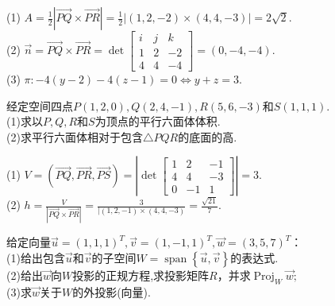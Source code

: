 \begin{solution}
    (1) $\displaystyle A= \frac{1}{2}|\overrightarrow{PQ} \times \overrightarrow{PR}|= \frac{1}{2}|(1,2,-2) \times (4,4,-3)| = 2\sqrt{2}. $\\
    (2) $\overrightarrow{n}= \overrightarrow{PQ} \times \overrightarrow{PR} = \det \begin{bmatrix}
        i &j &k \\
        1 &2 &-2 \\
        4 &4 &-4    
    \end{bmatrix} = (0,-4,-4)$.\\
    (3) $\pi: -4(y-2)-4(z-1)=0 \Leftrightarrow y+z=3$.
\end{solution}

\begin{problem}{}{}
    经定空间四点$P(1,2,0),Q(2,4,-1),R(5,6,-3)$和$S(1,1,1)$.\\
(1)求以$P,Q,R$和$S$为顶点的平行六面体体积.\\
(2)求平行六面体相对于包含$\triangle PQR$的底面的高.
\end{problem}

\begin{solution}
    (1) $ \displaystyle 
        V = (\overrightarrow{PQ},\overrightarrow{PR},\overrightarrow{PS}) =\left| \det \begin{bmatrix}
            1 &2 &-1 \\
            4 &4 &-3 \\
            0 &-1 &1
        \end{bmatrix} \right |= 3$.\\
    (2) $\displaystyle h = \frac{V}{|\overrightarrow{PQ} \times \overrightarrow{PR}|} = \frac{3}{|(1,2,-1) \times (4,4,-3)} = \frac{\sqrt{21}}{7}$.
\end{solution}

\begin{problem}{}{}
    给定向量$\overrightarrow{u}=(1,1,1)^{T},\overrightarrow{v}=(1,-1,1)^{T},\overrightarrow{w}=(3,5,7)^{T}$：\\
(1)给出包含$\overrightarrow{u}$和$\overrightarrow{v}$的子空间$W=\operatorname{span}\left\{\overrightarrow{u},\overrightarrow{v}\right\}$的表达式.\\
(2)给出$\overrightarrow{w}$向$W$投影的正规方程,求投影矩阵$R$，并求$\operatorname{Proj}_{W} \overrightarrow{w};$\\
(3)求$\overrightarrow{w}$关于$W$的外投影(向量).
\end{problem}

